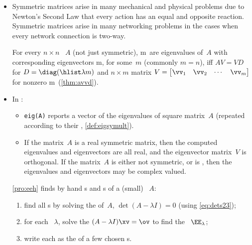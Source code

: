 \begin{itemize}
\item Symmetric matrices arise in many mechanical and physical problems due to Newton's Second Law that every action has an equal and opposite reaction.
Symmetric matrices arise in many networking problems in the cases when every network connection is two-way. 

\itemme For every \(n\times n\) ~\(A\) (not just symmetric),
\hlist\lambda m\ are eigenvalues of~\(A\) with corresponding eigenvectors \hlist\vv m, for some~\(m\) (commonly \(m=n\)), iff \(AV=VD\) for  \(D=\diag(\hlist\lambda m)\) and \(n\times m\) matrix \(V=\begin{bmatrix} \vv_1&\vv_2&\cdots&\vv_m \end{bmatrix}\) for nonzero \hlist\vv m\ (\cref{thm:avvd}).

\item In \script:
\begin{itemize}
\itemhi {}\verb|[V,D]=eig(A)| computes eigenvectors and the eigenvalues of the  \(n\times n\) ~\(A\).
\begin{itemize}
\item The \(n\)~s of~\(A\) (repeated according to their , \cref{def:eigsymult}) form the diagonal of \(n\times n\) square matrix \(D=\diag(\hlist\lambda n)\).
\item Corresponding to the \(j\)th~eigenvalue~\(\lambda_j\), the \(j\)th~column of \(n\times n\) square matrix~\(V\) is an  (of unit length).
\end{itemize}
\item \verb|eig(A)| reports a vector of the eigenvalues of square matrix~\(A\) (repeated according to their  , \cref{def:eigsymult}).

\item If the matrix~\(A\) is a real symmetric matrix, then the computed eigenvalues and eigenvectors are all real, and the eigenvector matrix~\(V\) is orthogonal.
If the matrix~\(A\) is either not symmetric, or is , then the eigenvalues and eigenvectors may be complex valued.

\end{itemize}


\itemme \cref{pro:eeh} finds by hand s and s of a (small) ~\(A\):
\begin{enumerate}
\item find all s by solving the  of~\(A\), \(\det(A-\lambda I)=0\) (using \eqref{eq:dets23});
\item for each ~\(\lambda\), solve the  \((A-\lambda I)\xv=\ov\) to find the ~\(\EE_\lambda\);
\item write each  as the  of a few chosen s.
\end{enumerate}






\end{itemize}
